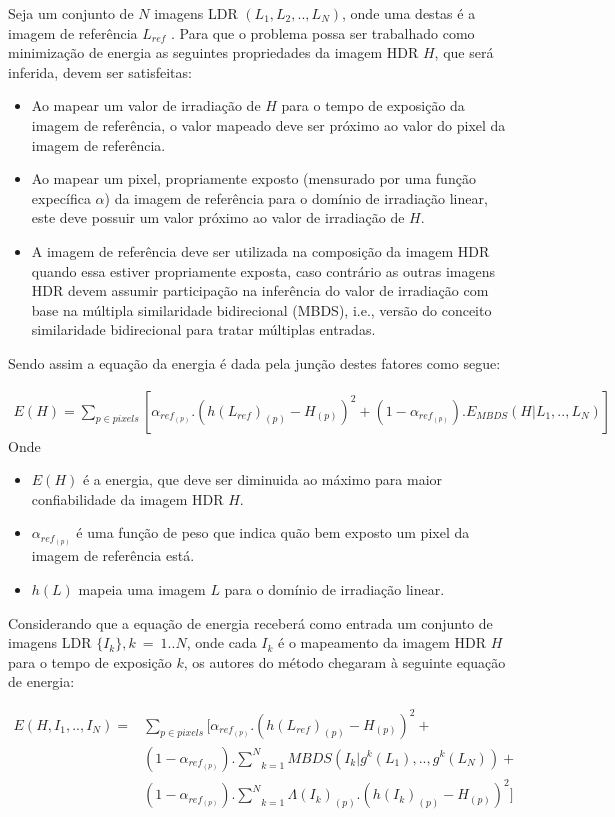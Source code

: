 Seja um conjunto de $N$ imagens LDR $(L_1,L_2,..,L_N)$, onde uma destas é a imagem de referência $L_{ref}$ . Para que o problema possa ser trabalhado como minimização de energia as seguintes propriedades da imagem HDR $H$, que será inferida, devem ser satisfeitas:

\begin{itemize}
	\item Ao mapear um valor de irradiação de $H$ para o tempo de exposição da imagem de referência, o valor mapeado deve ser próximo ao valor do pixel da imagem de referência.
	\item Ao mapear um pixel, propriamente exposto (mensurado por uma função expecífica $\alpha$) da imagem de referência para o domínio de irradiação linear, este deve possuir um valor próximo ao valor de irradiação de $H$.
	\item A imagem de referência deve ser utilizada na composição da imagem HDR quando essa estiver propriamente exposta, caso contrário as outras imagens HDR devem assumir participação na inferência do valor de irradiação com base na múltipla similaridade bidirecional (MBDS), i.e., versão do conceito similaridade bidirecional para tratar múltiplas entradas.
\end{itemize}

Sendo assim a equação da energia é dada pela junção destes fatores como segue:
 
\begin{align} \label{eqSenEnergia}
	E(H) = \sum\limits_{p \in pixels}{[\alpha_{ref_{(p)}}.(h(L_{ref})_{(p)} - H_{(p)})^2 + (1-\alpha_{ref_(p)}).E_{MBDS}(H|L_1,..,L_N)]}
\end{align}
Onde
\begin{itemize}
	\item $E(H)$ é a energia, que deve ser diminuida ao máximo para maior confiabilidade da imagem HDR $H$.
	\item $\alpha_{ref_{(p)}}$ é uma função de peso que indica quão bem exposto um pixel da imagem de referência está.
	\item $h(L)$ mapeia uma imagem $L$ para o domínio de irradiação linear. 
\end{itemize}

Considerando que a equação de energia receberá como entrada um conjunto de imagens LDR $\{I_k\}, k~=~1..N$, onde cada $I_k$ é o mapeamento da imagem HDR $H$ para o tempo de exposição $k$, os autores do método chegaram à seguinte equação de energia:

\begin{equation} \label{eqSenEnergia2}
\begin{split}
	E(H,I_1,..,I_N) = &\underset{p \in pixels}{\sum{}}[\alpha_{ref_{(p)}}.(h(L_{ref})_{(p)} - H_{(p)})^2 +\\
		   &(1-\alpha_{ref_(p)}).\underset{k=1}{\overset{N}{\sum{}}}MBDS(I_k|g^k(L_1),..,g^k(L_N)) +\\
		   &(1-\alpha_{ref_(p)}).\underset{k=1}{\overset{N}{\sum{}}}\Lambda(I_k)_{(p)}.(h(I_k)_{(p)} - H_{(p)})^2]
\end{split}
\end{equation}

